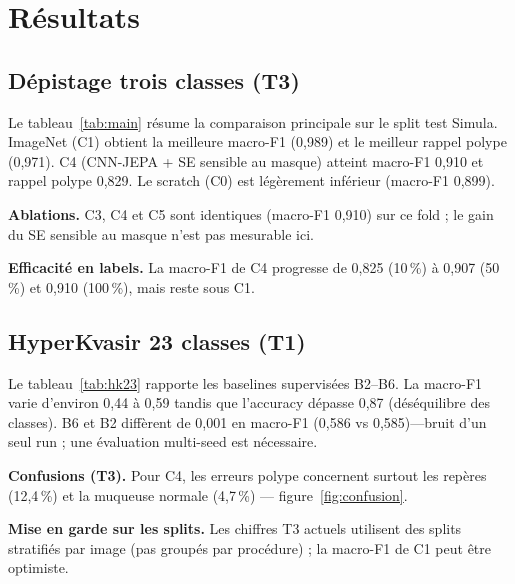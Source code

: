 \section{Résultats}
\label{sec:results}






\subsection{Dépistage trois classes (T3)}
Le tableau~\ref{tab:main} résume la comparaison principale sur le split test Simula.
ImageNet (C1) obtient la meilleure macro-F1 (0,989) et le meilleur rappel polype (0,971).
C4 (CNN-JEPA + SE sensible au masque) atteint macro-F1 0,910 et rappel polype 0,829.
Le scratch (C0) est légèrement inférieur (macro-F1 0,899).

\textbf{Ablations.} C3, C4 et C5 sont identiques (macro-F1 0,910) sur ce fold ; le gain du SE sensible au masque n'est pas mesurable ici.

\textbf{Efficacité en labels.} La macro-F1 de C4 progresse de 0,825 (10\,\%) à 0,907 (50\,\%) et 0,910 (100\,\%), mais reste sous C1.

\subsection{HyperKvasir 23 classes (T1)}
Le tableau~\ref{tab:hk23} rapporte les baselines supervisées B2--B6.
La macro-F1 varie d'environ 0,44 à 0,59 tandis que l'accuracy dépasse 0,87 (déséquilibre des classes).
B6 et B2 diffèrent de 0,001 en macro-F1 (0,586 vs 0,585)---bruit d'un seul run ; une évaluation multi-seed est nécessaire.

\textbf{Confusions (T3).} Pour C4, les erreurs polype concernent surtout les repères (12,4\,\%) et la muqueuse normale (4,7\,\%) --- figure~\ref{fig:confusion}.

\textbf{Mise en garde sur les splits.} Les chiffres T3 actuels utilisent des splits stratifiés par image (pas groupés par procédure) ; la macro-F1 de C1 peut être optimiste.
